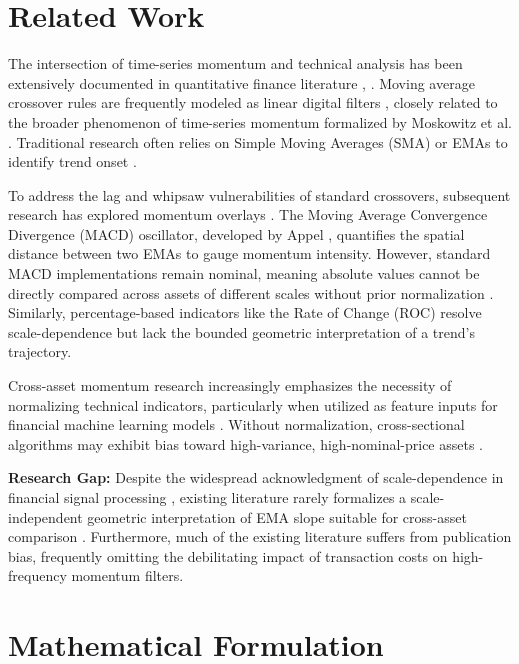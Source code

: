 \documentclass[conference]{IEEEtran}
\begin{document}
\section{Related Work}
The intersection of time-series momentum and technical analysis has been extensively documented in quantitative finance literature \cite{moskowitz2012}, \cite{hurst2017}. Moving average crossover rules are frequently modeled as linear digital filters \cite{shiryaev1999}, closely related to the broader phenomenon of time-series momentum formalized by Moskowitz et al. \cite{griffin2003}. Traditional research often relies on Simple Moving Averages (SMA) or EMAs to identify trend onset \cite{marshall2017}.

To address the lag and whipsaw vulnerabilities of standard crossovers, subsequent research has explored momentum overlays \cite{edwards2012}. The Moving Average Convergence Divergence (MACD) oscillator, developed by Appel \cite{appel2005}, quantifies the spatial distance between two EMAs to gauge momentum intensity. However, standard MACD implementations remain nominal, meaning absolute values cannot be directly compared across assets of different scales without prior normalization \cite{deprado2020}. Similarly, percentage-based indicators like the Rate of Change (ROC) resolve scale-dependence \cite{achelis2000} but lack the bounded geometric interpretation of a trend's trajectory. 

Cross-asset momentum research increasingly emphasizes the necessity of normalizing technical indicators, particularly when utilized as feature inputs for financial machine learning models \cite{dixon2020}. Without normalization, cross-sectional algorithms may exhibit bias toward high-variance, high-nominal-price assets \cite{tsagkanos2004}. 

\textbf{Research Gap:} Despite the widespread acknowledgment of scale-dependence in financial signal processing \cite{kao2020}, existing literature rarely formalizes a scale-independent geometric interpretation of EMA slope suitable for cross-asset comparison \cite{kaufman2019}. Furthermore, much of the existing literature suffers from publication bias, frequently omitting the debilitating impact of transaction costs on high-frequency momentum filters.

\section{Mathematical Formulation}
\end{document}
